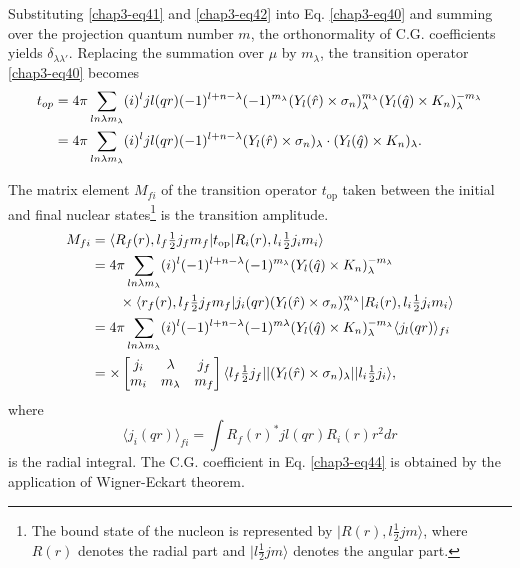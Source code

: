 Substituting \eqref{chap3-eq41} and \eqref{chap3-eq42} into Eq. \eqref{chap3-eq40} and summing over the projection quantum number $m$, the orthonormality of C.G. coefficients yields $\delta_{\lambda \lambda'}$. Replacing the summation over $\mu$ by $m_{\lambda}$, the transition operator \eqref{chap3-eq40} becomes
\begin{align}
  t_{op} & = 4 \pi \sum_{ln \lambda m_\lambda} (i)^l jl (qr) (-1)^{l + n - \lambda} (-1)^{m_\lambda} (Y_l({\boldmath \hat{r}}) \times \sigma_n)_\lambda^{m_\lambda} (Y_l ({\boldmath \hat{q}}) \times {\boldmath K}_n)_\lambda^{-m_\lambda} \notag \\
  & = 4 \pi \sum_{ln \lambda m_\lambda} (i)^l jl (qr) (-1)^{l+n-\lambda} (Y_l ({\boldmath \hat{r}}) \times \sigma_{n})_\lambda \cdot (Y_l ({\boldmath \hat{q}}) \times {\boldmath K}_n)_\lambda. \label{chap3-eq43}
\end{align}

The matrix element $M_{fi}$ of the transition operator $t_{\text{op}}$ taken between the initial and final nuclear states\footnote{The bound state of the nucleon is represented by $|R(r), l \tfrac{1}{2} jm \rangle$, where $R(r)$ denotes the radial part and $|l\tfrac{1}{2} jm \rangle$ denotes the angular part.} is the transition amplitude.
\begin{align}
  M_{fi} & = \langle R_f (r), l_f \tfrac{1}{2} j_f m_f| t_{\text{op}}| R_i (r) , l_i \tfrac{1}{2} j_i m_i \rangle \notag \\
  & = 4 \pi \sum_{ln\lambda m_\lambda} (i)^l (-1)^{l + n -\lambda} (-1)^{m_\lambda} (Y_l ({{\hat{\boldmath q}}}) \times {\boldmath K}_n)_{\lambda}^{-m_\lambda} \notag \\
  & \qquad \times \langle r_f (r), l_f \tfrac{1}{2} j_f m_f | j_i (qr) (Y_l ({\boldmath \hat{r}}) \times \sigma_n)_\lambda^{m_\lambda} |R_i (r), l_i \tfrac{1}{2} j_i m_i \rangle \notag \\
  & = 4\pi \sum_{ln \lambda m_\lambda} (i)^l (-1)^{l + n -\lambda} (-1)^{m \lambda} (Y_l({\boldmath \hat{q}})\times {\boldmath K}_n)^{-m_\lambda}_\lambda \langle j_l (qr)\rangle_{fi}\notag \\
  & = \times \begin{bmatrix} j_i & \lambda & j_f \\ m_i & m_\lambda & m_f \end{bmatrix}
  \langle l_f \tfrac{1}{2} j_f || (Y_l ({\boldmath \hat{r}}) \times \sigma_n)_\lambda|| l_i \tfrac{1}{2} j_i \rangle, \label{chap3-eq44}
\end{align}
where
$$
\langle j_i (qr)\rangle_{fi} = \int R_f (r)^\ast jl (qr) R_i (r) r^2 dr
$$
is the radial integral. The C.G. coefficient in Eq. \eqref{chap3-eq44} is obtained by the application of Wigner-Eckart theorem.

